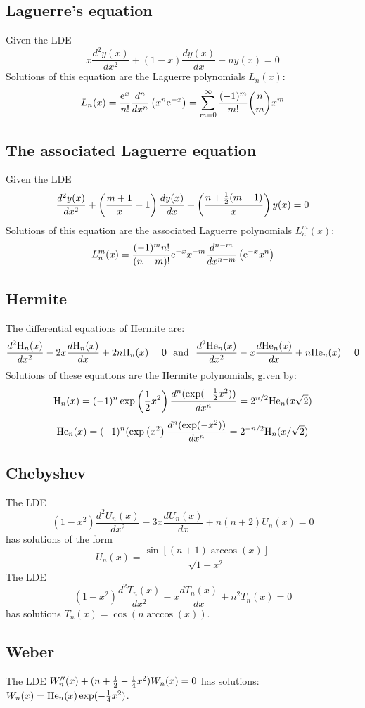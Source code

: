 \documentclass[twoside]{report}
\begin{document}
\subsection{Laguerre's equation}
Given the LDE
\[
x\frac{d^2y(x)}{dx^2}+(1-x)\frac{dy(x)}{dx}+ny(x)=0
\]
Solutions of this equation are the Laguerre polynomials $L_n(x)$:
\[
L_n(x)=\frac{{\rm e}^x}{n!}\frac{d^n}{dx^n}\left(x^n{\rm e}^{-x}\right)=
\sum_{m=0}^\infty\frac{(-1)^m}{m!}{n\choose m}x^m
\]

\subsection{The associated Laguerre equation}
Given the LDE
\[
\frac{d^2y(x)}{dx^2}+\left(\frac{m+1}{x}-1\right)\frac{dy(x)}{dx}+\left(\frac{n+\mbox{$\frac{1}{2}$}(m+1)}{x}\right)y(x)=0
\]
Solutions of this equation are the associated Laguerre polynomials $L_n^m(x)$:
\[
L_n^m(x)=\frac{(-1)^mn!}{(n-m)!}{\rm e}^{-x}x^{-m}\frac{d^{n-m}}{dx^{n-m}}\left({\rm e}^{-x}x^n\right)
\]

\subsection{Hermite}
\def\Hn{{\rm H}_n}
\def\Hen{{\rm He}_n}
The differential equations of Hermite are:
\[
\frac{d^2\Hn(x)}{dx^2}-2x\frac{d\Hn(x)}{dx}+2n\Hn(x)=0~~\mbox{and}~~
\frac{d^2\Hen(x)}{dx^2}-x\frac{d\Hen(x)}{dx}+n\Hen(x)=0
\]
Solutions of these equations are the Hermite polynomials, given by:
\[
\Hn(x)=(-1)^n\exp\left(\frac{1}{2}x^2\right)\frac{d^n(\exp(-\half x^2))}{dx^n}=2^{n/2}\Hen(x\sqrt{2})
\]
\[
\Hen(x)=(-1)^n(\exp\left(x^2\right)\frac{d^n(\exp(-x^2))}{dx^n}=2^{-n/2}\Hn(x/\sqrt{2})
\]

\subsection{Chebyshev}
The LDE
\[
(1-x^2)\frac{d^2U_n(x)}{dx^2}-3x\frac{dU_n(x)}{dx}+n(n+2)U_n(x)=0
\]
has solutions of the form
\[
U_n(x)=\frac{\sin[(n+1)\arccos(x)]}{\sqrt{1-x^2}}
\]
The LDE
\[
(1-x^2)\frac{d^2T_n(x)}{dx^2}-x\frac{dT_n(x)}{dx}+n^2T_n(x)=0
\]
has solutions $T_n(x)=\cos(n\arccos(x))$.

\subsection{Weber}
The LDE $W''_n(x)+(n+\mbox{$\frac{1}{2}$}-\mbox{$\frac{1}{4}$} x^2)W_n(x)=0$ has solutions:
$W_n(x)={\rm He}_n(x)\exp(-\mbox{$\frac{1}{4}$} x^2)$.
\end{document}
